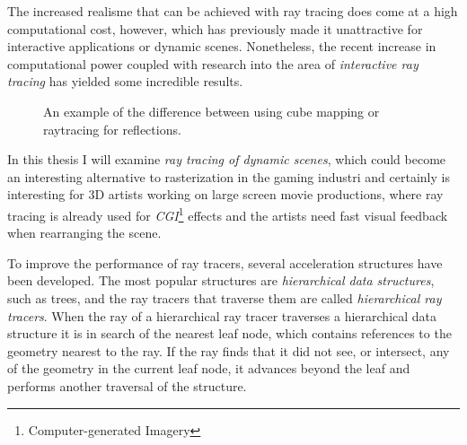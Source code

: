 
The increased realisme that can be achieved with ray tracing does come
at a high computational cost, however, which has previously made it
unattractive for interactive applications or dynamic
scenes. Nonetheless, the recent increase in computational power
coupled with research into the area of \textit{interactive ray
  tracing} has yielded some incredible results.

\begin{figure}
  \centering
  \hspace{10pt}
  \caption[Cube mapping vs raytracing for reflections.]{An example of
    the difference between using cube mapping or raytracing for
    reflections.}
  \label{fig:reflectingDragons}
\end{figure}



In this thesis I will examine \textit{ray tracing of dynamic scenes},
which could become an interesting alternative to rasterization in the
gaming industri and certainly is interesting for 3D artists working on
large screen movie productions, where ray tracing is already used for
\textit{CGI}\footnote{Computer-generated Imagery} effects and the
artists need fast visual feedback when rearranging the scene.



To improve the performance of ray tracers, several acceleration
structures have been developed. The most popular structures are
\textit{hierarchical data structures}, such as trees, and the ray
tracers that traverse them are called \textit{hierarchical ray
  tracers}. When the ray of a hierarchical ray tracer traverses a
hierarchical data structure it is in search of the nearest leaf node,
which contains references to the geometry nearest to the ray. If the
ray finds that it did not see, or intersect, any of the geometry in
the current leaf node, it advances beyond the leaf and performs
another traversal of the structure.

